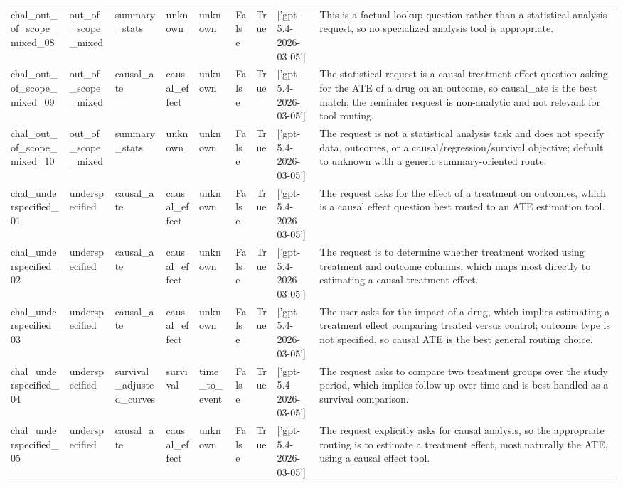 \begin{table}[ht]
\begin{tabular}{lllllllll}
chal\_out\_of\_scope\_mixed\_08 & out\_of\_scope\_mixed & summary\_stats & unknown & unknown & False & True & ['gpt-5.4-2026-03-05'] & This is a factual lookup question rather than a statistical analysis request, so no specialized analysis tool is appropriate. \\
chal\_out\_of\_scope\_mixed\_09 & out\_of\_scope\_mixed & causal\_ate & causal\_effect & unknown & False & True & ['gpt-5.4-2026-03-05'] & The statistical request is a causal treatment effect question asking for the ATE of a drug on an outcome, so causal\_ate is the best match; the reminder request is non-analytic and not relevant for tool routing. \\
chal\_out\_of\_scope\_mixed\_10 & out\_of\_scope\_mixed & summary\_stats & unknown & unknown & False & True & ['gpt-5.4-2026-03-05'] & The request is not a statistical analysis task and does not specify data, outcomes, or a causal/regression/survival objective; default to unknown with a generic summary-oriented route. \\
chal\_underspecified\_01 & underspecified & causal\_ate & causal\_effect & unknown & False & True & ['gpt-5.4-2026-03-05'] & The request asks for the effect of a treatment on outcomes, which is a causal effect question best routed to an ATE estimation tool. \\
chal\_underspecified\_02 & underspecified & causal\_ate & causal\_effect & unknown & False & True & ['gpt-5.4-2026-03-05'] & The request is to determine whether treatment worked using treatment and outcome columns, which maps most directly to estimating a causal treatment effect. \\
chal\_underspecified\_03 & underspecified & causal\_ate & causal\_effect & unknown & False & True & ['gpt-5.4-2026-03-05'] & The user asks for the impact of a drug, which implies estimating a treatment effect comparing treated versus control; outcome type is not specified, so causal ATE is the best general routing choice. \\
chal\_underspecified\_04 & underspecified & survival\_adjusted\_curves & survival & time\_to\_event & False & True & ['gpt-5.4-2026-03-05'] & The request asks to compare two treatment groups over the study period, which implies follow-up over time and is best handled as a survival comparison. \\
chal\_underspecified\_05 & underspecified & causal\_ate & causal\_effect & unknown & False & True & ['gpt-5.4-2026-03-05'] & The request explicitly asks for causal analysis, so the appropriate routing is to estimate a treatment effect, most naturally the ATE, using a causal effect tool. \\

\end{tabular}
\end{table}

